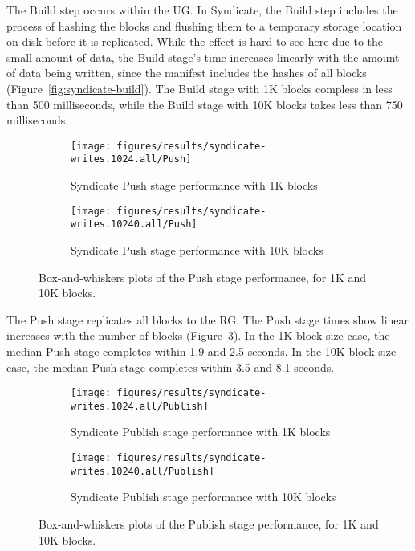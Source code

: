 The Build step occurs within the UG.  In Syndicate, the Build step includes the
process of hashing the blocks and flushing them to a temporary storage location on
disk before it is replicated.  While the effect is hard to see here due to the 
small amount of data, the Build stage's time increases linearly with the amount
of data being written, since the manifest includes the hashes of all blocks
(Figure~\ref{fig:syndicate-build}).  The Build stage with 1K blocks compless in
less than 500 milliseconds, while the Build stage with 10K blocks takes less
than 750 milliseconds.

\begin{figure}[htp!]
   \centering
   \begin{subfigure}[b]{.8\textwidth}
      \texttt{[image: figures/results/syndicate-writes.1024.all/Push]}
      \label{fig:syndicate-push-1k}
      \caption{Syndicate Push stage performance with 1K blocks}
   \end{subfigure}
   \begin{subfigure}[b]{.8\textwidth}
      \texttt{[image: figures/results/syndicate-writes.10240.all/Push]}
      \label{fig:syndicate-push-10k}
      \caption{Syndicate Push stage performance with 10K blocks}
   \end{subfigure}
   \caption{Box-and-whiskers plots of the Push stage performance, for 1K and
   10K blocks.}
   \label{fig:syndicate-push}
\end{figure}

The Push stage replicates all blocks to the RG.  The Push stage times show linear
increases with the number of blocks (Figure~\ref{fig:syndicate-push}).
In the 1K block size case, the median Push stage
completes within 1.9 and 2.5 seconds.  In the 10K block size case, the median
Push stage completes within 3.5 and 8.1 seconds.

\begin{figure}[htp!]
   \centering
   \begin{subfigure}[b]{.8\textwidth}
      \texttt{[image: figures/results/syndicate-writes.1024.all/Publish]}
      \label{fig:syndicate-publish-1k}
      \caption{Syndicate Publish stage performance with 1K blocks}
   \end{subfigure}
   \begin{subfigure}[b]{.8\textwidth}
      \texttt{[image: figures/results/syndicate-writes.10240.all/Publish]}
      \label{fig:syndicate-publish-10k}
      \caption{Syndicate Publish stage performance with 10K blocks}
   \end{subfigure}
   \caption{Box-and-whiskers plots of the Publish stage performance, for 1K and
   10K blocks.}
   \label{fig:syndicate-publish}
\end{figure}

